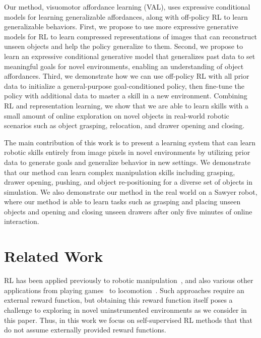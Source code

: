 \documentclass[letterpaper, 10 pt, conference]{ieeeconf}  %
\begin{document}
Our method, visuomotor affordance learning (VAL), uses expressive conditional models for learning generalizable affordances, along with off-policy RL to learn generalizable behaviors.
First, we propose to use more expressive generative models for RL to learn compressed representations of images that can reconstruct unseen objects and help the policy generalize to them.
Second, we propose to learn an expressive conditional generative model that generalizes past data to set meaningful goals for novel environments, enabling an understanding of object affordances.
Third, we demonstrate how we can use off-policy RL with all prior data to initialize a general-purpose goal-conditioned policy, then fine-tune the policy with additional data to master a skill in a new environment. 
Combining RL and representation learning, we show that we are able to learn skills with a small amount of online exploration on novel objects in real-world robotic scenarios such as object grasping, relocation, and drawer opening and closing.

The main contribution of this work is to present a learning system that can learn robotic skills entirely from image pixels in novel environments by utilizing prior data to generate goals and generalize behavior in new settings. We demonstrate that our method can learn complex manipulation skills including grasping, drawer opening, pushing, and object re-positioning for a diverse set of objects in simulation. We also demonstrate our method in the real world on a Sawyer robot, where our method is able to learn tasks such as grasping and placing unseen objects and opening and closing unseen drawers after only five minutes of online interaction.

\section{Related Work}
\label{sec:related}
RL has been applied previously to robotic manipulation~\cite{kober2008mp, peters2010reps, levine2016gps}, and also various other applications from playing games~\cite{mnih2013atari, silver2016alphago} to locomotion~\cite{benbrahim1997biped, kohl2004quadruped, deisenroth2011pilco, williams2017mpc}.
Such approaches require an external reward function, but obtaining this reward function itself poses a challenge to exploring in novel uninstrumented environments as we consider in this paper. 
Thus, in this work we focus on self-supervised RL methods that that do not assume externally provided reward functions.
\end{document}

